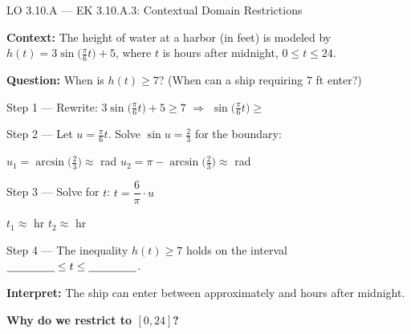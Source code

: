 \documentclass[10pt]{article}
\begin{document}
\vspace{0.06in}

\begin{notesbox}{LO 3.10.A --- EK 3.10.A.3: Contextual Domain Restrictions}

\textbf{Context:} The height of water at a harbor (in feet) is modeled by
$h(t) = 3\sin\!\bigl(\tfrac{\pi}{6}t\bigr) + 5$, where $t$ is hours after
midnight, $0 \le t \le 24$.

\vspace{6pt}
\textbf{Question:} When is $h(t) \ge 7$? (When can a ship requiring 7 ft enter?)

\vspace{4pt}
Step 1 --- Rewrite: $3\sin\!\bigl(\tfrac{\pi}{6}t\bigr) + 5 \ge 7$
\hspace{1em}$\Rightarrow$\hspace{1em}
$\sin\!\bigl(\tfrac{\pi}{6}t\bigr) \ge $ \underline{\hspace{2cm}}

\vspace{4pt}
Step 2 --- Let $u = \tfrac{\pi}{6}t$. Solve $\sin u = \tfrac{2}{3}$ for the boundary:

\vspace{3pt}
$u_1 = \arcsin\!\bigl(\tfrac{2}{3}\bigr) \approx $ \underline{\hspace{2cm}} rad
\hspace{1cm}
$u_2 = \pi - \arcsin\!\bigl(\tfrac{2}{3}\bigr) \approx $ \underline{\hspace{2cm}} rad

\vspace{4pt}
Step 3 --- Solve for $t$: $t = \dfrac{6}{\pi} \cdot u$

\vspace{3pt}
$t_1 \approx $ \underline{\hspace{2cm}} hr
\hspace{1.5cm}
$t_2 \approx $ \underline{\hspace{2cm}} hr

\vspace{4pt}
Step 4 --- The inequality $h(t) \ge 7$ holds on the interval
$\underline{\hspace{1.5cm}} \le t \le \underline{\hspace{1.5cm}}$.

\vspace{4pt}
\textbf{Interpret:} The ship can enter between approximately
\underline{\hspace{1.5cm}} and \underline{\hspace{1.5cm}} hours after midnight.

\vspace{4pt}
\textbf{Why do we restrict to $[0, 24]$?} \writeline

\end{notesbox}
\end{document}
